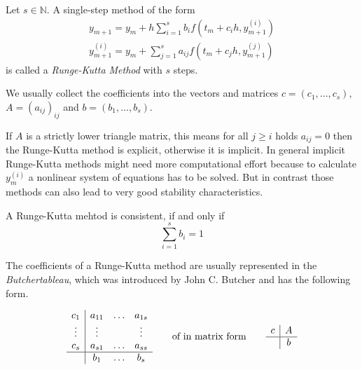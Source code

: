 		\begin{definition}
			Let $s \in \mathbb{N}$. A single-step method of the form
			\begin{align}
				y_{m+1} = y_m + h \sum_{i=1}^{s} b_i f(t_m + c_ih, y_{m+1}^{(i)}) \\ 
				y_{m+1}^{(i)} = y_m +  \sum_{j=1}^{s} a_{ij} f(t_m + c_jh, y_{m+1}^{(j)})
			\end{align}
			is called a \emph{Runge-Kutta Method} with $s$ steps.
		\end{definition}
		
		We usually collect the coefficients into the vectors and matrices $c=(c_1, ...,c_s)$, $A = (a_{ij})_{ij}$ and $b=(b_1, ..., b_s)$.
		
		If $A$ is a strictly lower triangle matrix, this means for all $j \geq i$ holds $a_{ij} = 0$ then the Runge-Kutta method is explicit, otherwise it is implicit. In general implicit Runge-Kutta methods might need more computational effort because to calculate $y_m^{(i)}$ a nonlinear system of equations has to be solved. But in contrast those methods can also lead to very good stability characteristics.
		
		\begin{lemma}\cite{NumerikGewöhnlicherDifferentialgleichungen}
			A Runge-Kutta mehtod is consistent, if and only if
			\begin{displaymath}
				\sum_{i=1}^{s} b_i = 1
			\end{displaymath}
		\end{lemma}
	
		The coefficients of a Runge-Kutta method are usually represented in the \emph{Butchertableau}, which was introduced by John C. Butcher and has the following form.
		
		\begin{displaymath}
			\begin{array}{c|ccc}
				c_1 & a_{11} & \dots & a_{1s} \\
				\vdots & \vdots & & \vdots \\
				c_s & a_{s1} & \dots & a_{ss} \\
				\hline
				 & b_1 & \dots & b_s
			\end{array}
			\qquad
			\text{of in matrix form}
			\qquad
			\begin{array}{c|c}
				c & A \\
				\hline
				 & b
			\end{array}
		\end{displaymath}
	
